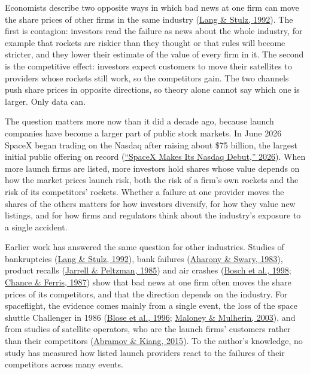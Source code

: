 \documentclass[12pt,a4paper]{article}
\begin{document}
Economists describe two opposite ways in which bad news at one firm can move the share prices of other firms in the same industry (\hyperlink{ref-lang1992}{Lang \& Stulz, 1992}). The first is contagion: investors read the failure as news about the whole industry, for example that rockets are riskier than they thought or that rules will become stricter, and they lower their estimate of the value of every firm in it. The second is the competitive effect: investors expect customers to move their satellites to providers whose rockets still work, so the competitors gain. The two channels push share prices in opposite directions, so theory alone cannot say which one is larger. Only data can.

The question matters more now than it did a decade ago, because launch companies have become a larger part of public stock markets. In June 2026 SpaceX began trading on the Nasdaq after raising about \$75 billion, the largest initial public offering on record (\hyperlink{ref-euronews2026}{“SpaceX Makes Its Nasdaq Debut,” 2026}). When more launch firms are listed, more investors hold shares whose value depends on how the market prices launch risk, both the risk of a firm's own rockets and the risk of its competitors' rockets. Whether a failure at one provider moves the shares of the others matters for how investors diversify, for how they value new listings, and for how firms and regulators think about the industry's exposure to a single accident.

Earlier work has answered the same question for other industries. Studies of bankruptcies (\hyperlink{ref-lang1992}{Lang \& Stulz, 1992}), bank failures (\hyperlink{ref-aharony1983}{Aharony \& Swary, 1983}), product recalls (\hyperlink{ref-jarrell1985}{Jarrell \& Peltzman, 1985}) and air crashes (\hyperlink{ref-bosch1998}{Bosch et al., 1998}; \hyperlink{ref-chance1987}{Chance \& Ferris, 1987}) show that bad news at one firm often moves the share prices of its competitors, and that the direction depends on the industry. For spaceflight, the evidence comes mainly from a single event, the loss of the space shuttle Challenger in 1986 (\hyperlink{ref-blose1996}{Blose et al., 1996}; \hyperlink{ref-maloney2003}{Maloney \& Mulherin, 2003}), and from studies of satellite operators, who are the launch firms' customers rather than their competitors (\hyperlink{ref-abramov2015}{Abramov \& Kiang, 2015}). To the author's knowledge, no study has measured how listed launch providers react to the failures of their competitors across many events.
\end{document}
